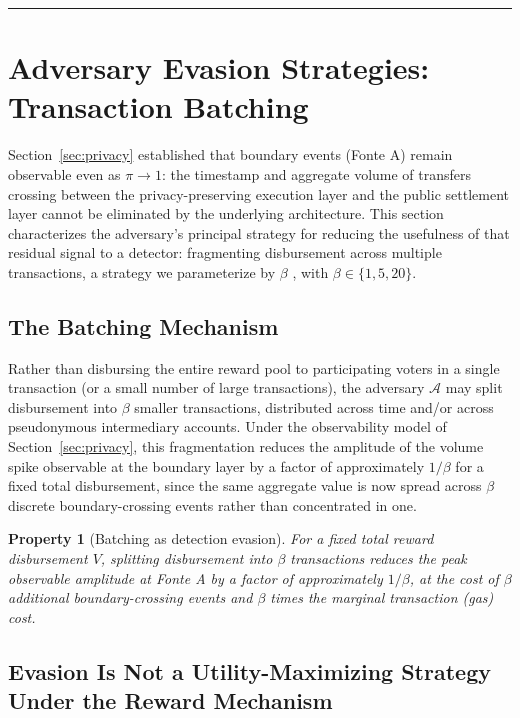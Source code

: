 \documentclass[journal,onecolumn,11pt]{IEEEtran}
\newtheorem{property}{Property}
\begin{document}
\bigskip
\hrule
\bigskip

\section{Adversary Evasion Strategies: Transaction Batching}
\label{sec:evasion}

Section~\ref{sec:privacy} established that boundary events (Fonte A) remain
observable even as $\pi \to 1$: the timestamp and aggregate volume of transfers
crossing between the privacy-preserving execution layer and the public
settlement layer cannot be eliminated by the underlying architecture. This
section characterizes the adversary's principal strategy for reducing the
usefulness of that residual signal to a detector: fragmenting disbursement
across multiple transactions, a strategy we parameterize by $\beta$ , with $\beta \in \{1, 5, 20\}$.

\subsection{The Batching Mechanism}
\label{subsec:batching-mechanism}

Rather than disbursing the entire reward pool to participating voters in a
single transaction (or a small number of large transactions), the adversary
$\mathcal{A}$ may split disbursement into $\beta$ smaller transactions,
distributed across time and/or across pseudonymous intermediary accounts.
Under the observability model of Section~\ref{sec:privacy}, this fragmentation
reduces the amplitude of the volume spike observable at the boundary layer by
a factor of approximately $1/\beta$ for a fixed total disbursement, since the
same aggregate value is now spread across $\beta$ discrete boundary-crossing
events rather than concentrated in one. 

\begin{property}[Batching as detection evasion]
\label{prop:batching-evasion}
For a fixed total reward disbursement $V$, splitting disbursement into
$\beta$ transactions reduces the peak observable amplitude at Fonte A by a
factor of approximately $1/\beta$, at the cost of $\beta$ additional
boundary-crossing events and $\beta$ times the marginal transaction (gas) cost.
\end{property}

\subsection{Evasion Is Not a Utility-Maximizing Strategy Under the Reward Mechanism}
\label{subsec:evasion-not-utility}
\end{document}
